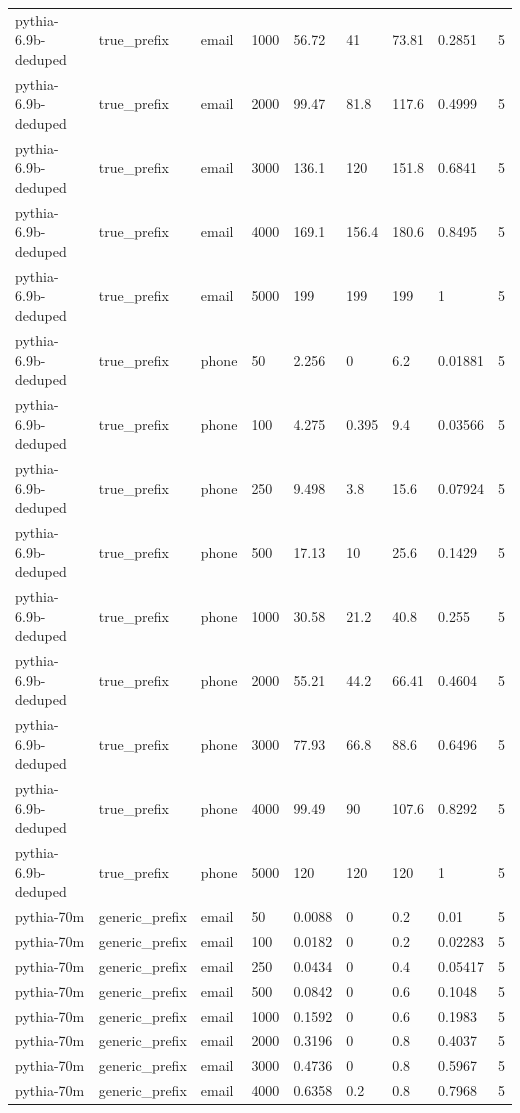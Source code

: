 \begin{tabular}{lllllllll}
pythia-6.9b-deduped & true\_prefix & email & 1000 & 56.72 & 41 & 73.81 & 0.2851 & 5 \\
pythia-6.9b-deduped & true\_prefix & email & 2000 & 99.47 & 81.8 & 117.6 & 0.4999 & 5 \\
pythia-6.9b-deduped & true\_prefix & email & 3000 & 136.1 & 120 & 151.8 & 0.6841 & 5 \\
pythia-6.9b-deduped & true\_prefix & email & 4000 & 169.1 & 156.4 & 180.6 & 0.8495 & 5 \\
pythia-6.9b-deduped & true\_prefix & email & 5000 & 199 & 199 & 199 & 1 & 5 \\
pythia-6.9b-deduped & true\_prefix & phone & 50 & 2.256 & 0 & 6.2 & 0.01881 & 5 \\
pythia-6.9b-deduped & true\_prefix & phone & 100 & 4.275 & 0.395 & 9.4 & 0.03566 & 5 \\
pythia-6.9b-deduped & true\_prefix & phone & 250 & 9.498 & 3.8 & 15.6 & 0.07924 & 5 \\
pythia-6.9b-deduped & true\_prefix & phone & 500 & 17.13 & 10 & 25.6 & 0.1429 & 5 \\
pythia-6.9b-deduped & true\_prefix & phone & 1000 & 30.58 & 21.2 & 40.8 & 0.255 & 5 \\
pythia-6.9b-deduped & true\_prefix & phone & 2000 & 55.21 & 44.2 & 66.41 & 0.4604 & 5 \\
pythia-6.9b-deduped & true\_prefix & phone & 3000 & 77.93 & 66.8 & 88.6 & 0.6496 & 5 \\
pythia-6.9b-deduped & true\_prefix & phone & 4000 & 99.49 & 90 & 107.6 & 0.8292 & 5 \\
pythia-6.9b-deduped & true\_prefix & phone & 5000 & 120 & 120 & 120 & 1 & 5 \\
pythia-70m & generic\_prefix & email & 50 & 0.0088 & 0 & 0.2 & 0.01 & 5 \\
pythia-70m & generic\_prefix & email & 100 & 0.0182 & 0 & 0.2 & 0.02283 & 5 \\
pythia-70m & generic\_prefix & email & 250 & 0.0434 & 0 & 0.4 & 0.05417 & 5 \\
pythia-70m & generic\_prefix & email & 500 & 0.0842 & 0 & 0.6 & 0.1048 & 5 \\
pythia-70m & generic\_prefix & email & 1000 & 0.1592 & 0 & 0.6 & 0.1983 & 5 \\
pythia-70m & generic\_prefix & email & 2000 & 0.3196 & 0 & 0.8 & 0.4037 & 5 \\
pythia-70m & generic\_prefix & email & 3000 & 0.4736 & 0 & 0.8 & 0.5967 & 5 \\
pythia-70m & generic\_prefix & email & 4000 & 0.6358 & 0.2 & 0.8 & 0.7968 & 5 \\

\end{tabular}
